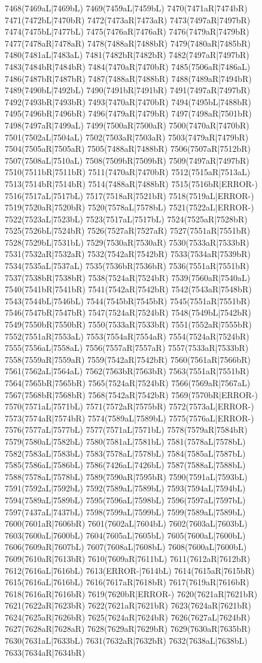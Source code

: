 7468(7469aL|7469bL) 7469(7459aL|7459bL) 7470(7471aR|7474bR) 7471(7472bL|7470bR) 7472(7473aR|7473aR) 7473(7497aR|7497bR) 7474(7475bL|7477bL) 7475(7476aR|7476aR) 7476(7479aR|7479bR) 7477(7478aR|7478aR) 7478(7488aR|7488bR) 7479(7480aR|7485bR) 7480(7481aL|7483aL) 7481(7482bR|7482bR) 7482(7497aR|7497bR) 7483(7484bR|7484bR) 7484(7470aR|7470bR) 7485(7506aR|7486aL) 7486(7487bR|7487bR) 7487(7488aR|7488bR) 7488(7489aR|7494bR) 7489(7490bL|7492bL) 7490(7491bR|7491bR) 7491(7497aR|7497bR) 7492(7493bR|7493bR) 7493(7470aR|7470bR) 7494(7495bL|7488bR) 7495(7496bR|7496bR) 7496(7479aR|7479bR) 7497(7498aR|7501bR) 7498(7497aR|7499aL) 7499(7500aR|7500aR) 7500(7470aR|7470bR) 7501(7502aL|7504aL) 7502(7503aR|7503aR) 7503(7479aR|7479bR) 7504(7505aR|7505aR) 7505(7488aR|7488bR) 7506(7507aR|7512bR) 7507(7508aL|7510aL) 7508(7509bR|7509bR) 7509(7497aR|7497bR) 7510(7511bR|7511bR) 7511(7470aR|7470bR) 7512(7515aR|7513aL) 7513(7514bR|7514bR) 7514(7488aR|7488bR) 7515(7516bR|ERROR-) 7516(7517aL|7517bL) 7517(7518aR|7521bR) 7518(7519aL|ERROR-) 7519(7520aR|7520bR) 7520(7578aL|7578bL) 7521(7522aL|ERROR-) 7522(7523aL|7523bL) 7523(7517aL|7517bL) 7524(7525aR|7528bR) 7525(7526bL|7524bR) 7526(7527aR|7527aR) 7527(7551aR|7551bR) 7528(7529bL|7531bL) 7529(7530aR|7530aR) 7530(7533aR|7533bR) 7531(7532aR|7532aR) 7532(7542aR|7542bR) 7533(7534aR|7539bR) 7534(7535aL|7537aL) 7535(7536bR|7536bR) 7536(7551aR|7551bR) 7537(7538bR|7538bR) 7538(7524aR|7524bR) 7539(7560aR|7540aL) 7540(7541bR|7541bR) 7541(7542aR|7542bR) 7542(7543aR|7548bR) 7543(7544bL|7546bL) 7544(7545bR|7545bR) 7545(7551aR|7551bR) 7546(7547bR|7547bR) 7547(7524aR|7524bR) 7548(7549bL|7542bR) 7549(7550bR|7550bR) 7550(7533aR|7533bR) 7551(7552aR|7555bR) 7552(7551aR|7553aL) 7553(7554aR|7554aR) 7554(7524aR|7524bR) 7555(7556aL|7558aL) 7556(7557aR|7557aR) 7557(7533aR|7533bR) 7558(7559aR|7559aR) 7559(7542aR|7542bR) 7560(7561aR|7566bR) 7561(7562aL|7564aL) 7562(7563bR|7563bR) 7563(7551aR|7551bR) 7564(7565bR|7565bR) 7565(7524aR|7524bR) 7566(7569aR|7567aL) 7567(7568bR|7568bR) 7568(7542aR|7542bR) 7569(7570bR|ERROR-) 7570(7571aL|7571bL) 7571(7572aR|7575bR) 7572(7573aL|ERROR-) 7573(7574aR|7574bR) 7574(7589aL|7589bL) 7575(7576aL|ERROR-) 7576(7577aL|7577bL) 7577(7571aL|7571bL) 7578(7579aR|7584bR) 7579(7580aL|7582bL) 7580(7581aL|7581bL) 7581(7578aL|7578bL) 7582(7583aL|7583bL) 7583(7578aL|7578bL) 7584(7585aL|7587bL) 7585(7586aL|7586bL) 7586(7426aL|7426bL) 7587(7588aL|7588bL) 7588(7578aL|7578bL) 7589(7590aR|7595bR) 7590(7591aL|7593bL) 7591(7592aL|7592bL) 7592(7589aL|7589bL) 7593(7594aL|7594bL) 7594(7589aL|7589bL) 7595(7596aL|7598bL) 7596(7597aL|7597bL) 7597(7437aL|7437bL) 7598(7599aL|7599bL) 7599(7589aL|7589bL) 7600(7601aR|7606bR) 7601(7602aL|7604bL) 7602(7603aL|7603bL) 7603(7600aL|7600bL) 7604(7605aL|7605bL) 7605(7600aL|7600bL) 7606(7609aR|7607bL) 7607(7608aL|7608bL) 7608(7600aL|7600bL) 7609(7610aR|7613bR) 7610(7609aR|7611bL) 7611(7612aR|7612bR) 7612(7616aL|7616bL) 7613(ERROR-|7614bL) 7614(7615aR|7615bR) 7615(7616aL|7616bL) 7616(7617aR|7618bR) 7617(7619aR|7616bR) 7618(7616aR|7616bR) 7619(7620bR|ERROR-) 7620(7621aR|7621bR) 7621(7622aR|7623bR) 7622(7621aR|7621bR) 7623(7624aR|7621bR) 7624(7625aR|7626bR) 7625(7624aR|7624bR) 7626(7627aL|7624bR) 7627(7628aR|7628aR) 7628(7629aR|7629bR) 7629(7630aR|7635bR) 7630(7631aL|7633bL) 7631(7632aR|7632bR) 7632(7638aL|7638bL) 7633(7634aR|7634bR) 